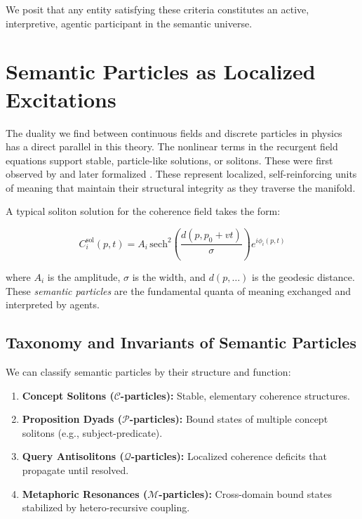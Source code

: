 We posit that any entity satisfying these criteria constitutes an active, interpretive, agentic participant in the semantic universe.


\section{Semantic Particles as Localized Excitations}
\label{13.6:semantic_particles_as_localized_excitations}

The duality we find between continuous fields and discrete particles in physics has a direct parallel in this theory. The nonlinear terms in the recurgent field equations support stable, particle-like solutions, or solitons. These were first observed by \autocite{Russell1845} and later formalized \autocite{KortewegdeVries1895, ZabuskyKruskal1965}. These represent localized, self-reinforcing units of meaning that maintain their structural integrity as they traverse the manifold.

A typical soliton solution for the coherence field takes the form:

\begin{equation}
C_i^{\mathrm{sol}}(p, t) = A_i\, \mathrm{sech}^2\left(\frac{d(p, p_0 + vt)}{\sigma}\right) e^{i\phi_i(p, t)}
\end{equation}

where \(A_i\) is the amplitude, \(\sigma\) is the width, and \(d(p, \dots)\) is the geodesic distance. These \textit{semantic particles} are the fundamental quanta of meaning exchanged and interpreted by agents.


\subsection{Taxonomy and Invariants of Semantic Particles}
\label{13.6.1:taxonomy_and_invariants_of_semantic_particles}

We can classify semantic particles by their structure and function:

\begin{enumerate}

    \item \textbf{Concept Solitons (\(\mathcal{C}\)-particles):} Stable, elementary coherence structures.

    \item \textbf{Proposition Dyads (\(\mathcal{P}\)-particles):} Bound states of multiple concept solitons (e.g., subject-predicate).

    \item \textbf{Query Antisolitons (\(\mathcal{Q}\)-particles):} Localized coherence deficits that propagate until resolved.

    \item \textbf{Metaphoric Resonances (\(\mathcal{M}\)-particles):} Cross-domain bound states stabilized by hetero-recursive coupling.

\end{enumerate}

